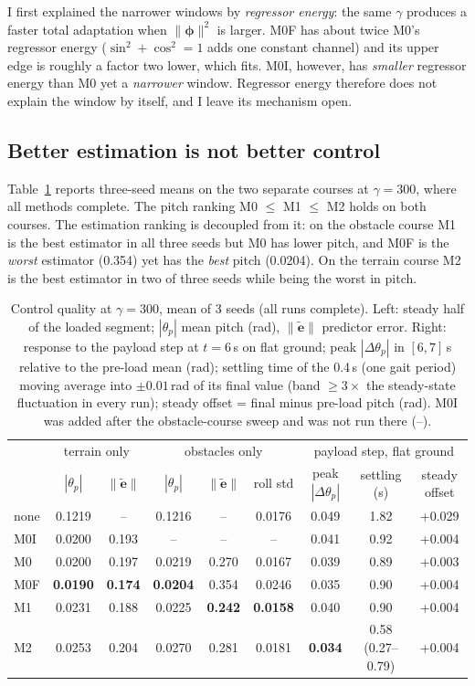 \documentclass[conference]{IEEEtran}
\newcommand{\etilde}{\tilde{\bm e}}
\begin{document}
I first explained the narrower windows by \emph{regressor energy}: the
same $\gamma$ produces a faster total adaptation when
$\|\bm\phi\|^2$ is larger. M0F has about twice M0's regressor energy
($\sin^2+\cos^2=1$ adds one constant channel) and its upper edge is
roughly a factor two lower, which fits. M0I, however, has
\emph{smaller} regressor energy than M0 yet a \emph{narrower} window.
Regressor energy therefore does not explain the window by itself, and I
leave its mechanism open.

\subsection{Better estimation is not better control}\label{sec:res_est}
Table~\ref{tab:quality} reports three-seed means on the two separate
courses at $\gamma=300$, where all methods complete. The pitch ranking
M0 $\le$ M1 $\le$ M2 holds on both courses. The estimation ranking is
decoupled from it: on the obstacle course M1 is the best estimator in
all three seeds but M0 has lower pitch, and M0F is the \emph{worst}
estimator (0.354) yet has the \emph{best} pitch (0.0204). On the terrain
course M2 is the best estimator in two of three seeds while being the
worst in pitch.

\begin{table}[t]
\centering
\caption{Control quality at $\gamma=300$, mean of 3 seeds (all runs
complete). Left: steady half of the loaded segment; $|\theta_p|$ mean
pitch (rad), $\|\etilde\|$ predictor error. Right: response to the
payload step at $t=6$\,s on flat ground; peak $|\Delta\theta_p|$ in
$[6,7]$\,s relative to the pre-load mean (rad); settling time of the
0.4\,s (one gait period) moving average into $\pm0.01$\,rad of its final
value (band $\ge3\times$ the steady-state fluctuation in every run);
steady offset = final minus pre-load pitch (rad). M0I was added after
the obstacle-course sweep and was not run there (--).}
\label{tab:quality}
\renewcommand{\arraystretch}{1.12}
\setlength{\tabcolsep}{5pt}
\begin{tabular}{lcccccccc}
\hline
 & \multicolumn{2}{c}{terrain only} & \multicolumn{3}{c}{obstacles only} & \multicolumn{3}{c}{payload step, flat ground}\\
 & $|\theta_p|$ & $\|\etilde\|$ & $|\theta_p|$ & $\|\etilde\|$ & roll std & peak $|\Delta\theta_p|$ & settling (s) & steady offset\\
\hline
none & 0.1219 & -- & 0.1216 & -- & 0.0176 & 0.049 & 1.82 & +0.029\\
M0I & 0.0200 & 0.193 & -- & -- & -- & 0.041 & 0.92 & +0.004\\
M0 & 0.0200 & 0.197 & 0.0219 & 0.270 & 0.0167 & 0.039 & 0.89 & +0.003\\
M0F & \textbf{0.0190} & \textbf{0.174} & \textbf{0.0204} & 0.354 & 0.0246 & 0.035 & 0.90 & +0.004\\
M1 & 0.0231 & 0.188 & 0.0225 & \textbf{0.242} & \textbf{0.0158} & 0.040 & 0.90 & +0.004\\
M2 & 0.0253 & 0.204 & 0.0270 & 0.281 & 0.0181 & \textbf{0.034} & 0.58 (0.27--0.79) & +0.004\\
\hline
\end{tabular}
\end{table}
\end{document}
